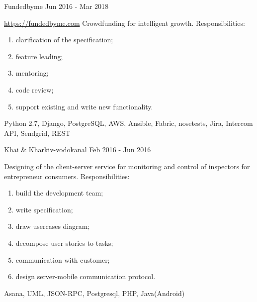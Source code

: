 \documentclass[11pt,a4paper]{moderncv}
\begin{document}
	\cvline
	{Fundedbyme Jun 2016 - Mar 2018}
	{\url{https://fundedbyme.com}\newline{}
		Crowdfunding for intelligent growth.\newline{}
        Responsibilities:
            \begin{enumerate}
                \item clarification of the specification;
                \item feature leading;
                \item mentoring;
                \item code review;
                \item support existing and write new functionality.
            \end{enumerate}
		\newline{}\newline{}
		Python 2.7, Django, PostgreSQL, AWS, Ansible, Fabric, nosetests, Jira, Intercom API, Sendgrid, REST}

	\cvline
	{Khai \& Kharkiv-vodokanal  Feb 2016 - Jun 2016}
    {Designing of the client-server service for monitoring and control of inspectors for entrepreneur consumers.\newline{}
    Responsibilities:
        \begin{enumerate}
            \item build the development team;
            \item write specification;
            \item draw usercases diagram;
            \item decompose user stories to tasks;
            \item communication with customer;
            \item design server-mobile communication protocol.
        \end{enumerate}
    \newline{}\newline{}
    Asana, UML, JSON-RPC, Postgresql, PHP, Java(Android)}
\end{document}
